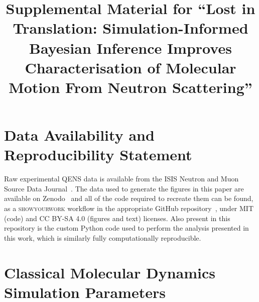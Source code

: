 \documentclass[reprint,
               superscriptaddress,
               nobibnotes,
               amsmath,
               amssymb,
               aps,
               hidelinks, 
               pre]{revtex4-2}
\makeatletter
\newcommand{\papertitle}{Lost in Translation: Simulation-Informed Bayesian Inference Improves Characterisation of Molecular Motion From Neutron Scattering}
\def\maketitle{
\@author@finish
\title@column\titleblock@produce
\suppressfloats[t]}
\makeatother
\begin{document}
\section*{Data Availability and Reproducibility Statement}

Raw experimental QENS data is available from the ISIS Neutron and Muon Source Data Journal~\cite{iris_data, plet_data}. 
The data used to generate the figures in this paper are available on Zenodo~\cite{Richardson2026} and all of the code required to recreate them can be found, as a \textsc{showyourwork} workflow in the appropriate GitHub repository~\cite{Richardson2026a}, under MIT (code) and CC BY-SA 4.0 (figures and text) licenses.
Also present in this repository is the custom Python code used to perform the analysis presented in this work, which is similarly fully computationally reproducible.  




\let\addcontentsline\oldaddcontentsline

\onecolumngrid
\clearpage 

\appendix
\renewcommand\thesection{SI.\Roman{section}}
\renewcommand\thefigure{SI.\arabic{figure}}
\setcounter{figure}{0}
\renewcommand\theequation{SI.\arabic{equation}}
\setcounter{equation}{0}
\renewcommand\thetable{SI.\arabic{table}}
\setcounter{table}{0}
\renewcommand\thepage{SI.\arabic{page}}


\title{Supplemental Material for ``\papertitle''}
\maketitle

\onecolumngrid
\vspace{-1.5cm}

\section{Classical Molecular Dynamics Simulation Parameters}
\label{sec:mdsim}
\end{document}
